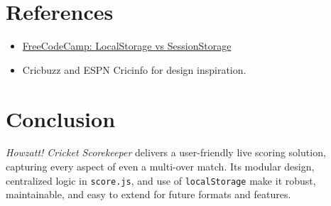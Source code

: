\documentclass[a4paper,12pt]{article}
\begin{document}
\section*{References}

\begin{itemize}
  \item \href{https://www.freecodecamp.org/news/web-storage-localstorage-vs-sessionstorage-in-javascript/}{FreeCodeCamp: LocalStorage vs SessionStorage}
  \item Cricbuzz and ESPN Cricinfo for design inspiration.
\end{itemize}

\vspace{0.5cm}

\section*{Conclusion}

\textit{Howzatt! Cricket Scorekeeper} delivers a user-friendly live scoring solution, capturing every aspect of even a multi-over match. Its modular design, centralized logic in \texttt{score.js}, and use of \texttt{localStorage} make it robust, maintainable, and easy to extend for future formats and features.
\end{document}
